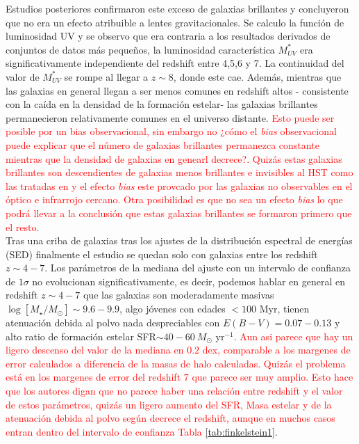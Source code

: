 Estudios posteriores confirmaron este exceso de galaxias brillantes y concluyeron que no era un efecto atribuible a lentes gravitacionales. Se calculo la función de luminosidad UV y se observo que era contraria a los resultados derivados de conjuntos de datos más pequeños, la luminosidad característica $M_{UV}^*$ era significativamente independiente del redshift entre 4,5,6 y 7. La continuidad del valor de $M_{UV}^*$ se rompe al llegar a $z\sim 8$, donde este cae. Además, mientras que las galaxias en general llegan a ser menos comunes en redshift altos - consistente con la caída en la densidad de la formación estelar- las galaxias brillantes permanecieron relativamente comunes en el universo distante. \textcolor{red}{Esto puede ser posible por un bias observacional, sin embargo no ¿cómo el \textit{bias} observacional puede explicar que el número de galaxias brillantes permanezca constante mientras que la densidad de galaxias en genearl decrece?. Quizás estas galaxias brillantes son descendientes de galaxias menos brillantes e invisibles al HST como las tratadas en \cite{wang2019dominant} y el efecto \textit{bias} este provcado por las galaxias no observables en el óptico e infrarrojo cercano. Otra posibilidad es que no sea un efecto \textit{bias} lo que podrá llevar a la conclusión que estas galaxias brillantes se formaron primero que el resto.}\\

Tras una criba de galaxias tras los ajustes de la distribución espectral de energías (SED) finalmente el estudio se quedan solo con galaxias entre los redshift $z\sim 4-7$. Los parámetros de la mediana del ajuste con un intervalo de confianza de $1\sigma$ no evolucionan significativamente, es decir, podemos hablar en general en redshift $z\sim 4-7$ que las galaxias son moderadamente masivas $\log[M_\star/M_\odot]\sim 9.6-9.9$, algo jóvenes con edades $<100$ Myr, tienen atenuación debida al polvo nada despreciables con $E(B-V)=0.07-0.13$ y alto ratio de formación estelar SFR$\sim 40-60\ M_\odot$ yr$^{-1}$. \textcolor{red}{Aun asi parece que hay un ligero descenso del valor de la mediana en $0.2$ dex, comparable a los margenes de error calculados a diferencia de la masas de halo calculadas. Quizás el problema está en los margenes de error del redshift $7$ que parece ser muy amplio. Esto hace que los autores digan que no parece haber una relación entre redshift y el valor de estos parámetros, quizás un ligero aumento del SFR, Masa estelar y de la atenuación debida al polvo según decrece el redshift, aunque en muchos casos entran dentro del intervalo de confianza Tabla \ref{tab:finkelstein1}}.\\

